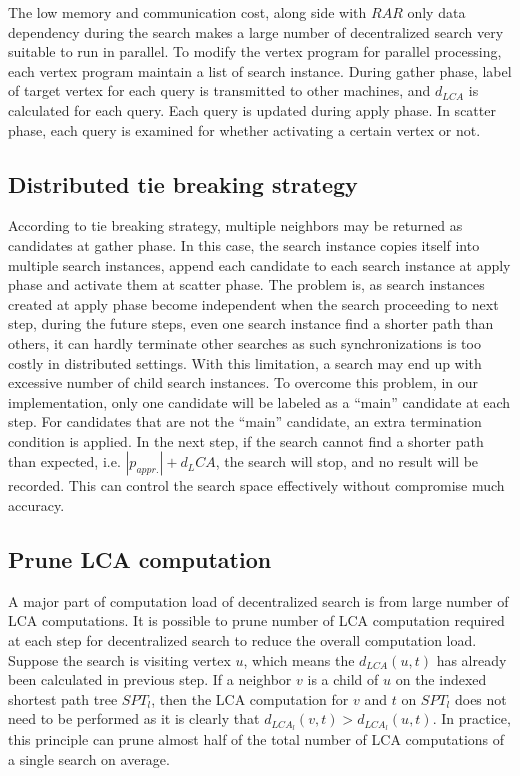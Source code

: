 The low memory and communication cost, along side with $RAR$ only data dependency during the search makes a large number of decentralized search very suitable to run in parallel. To modify the vertex program for parallel processing, each vertex program maintain a list of search instance. During gather phase, label of target vertex for each query is transmitted to other machines, and $d_{LCA}$ is calculated for each query. Each query is updated during apply phase. In scatter phase, each query is examined for whether activating a certain vertex or not.

\subsection{Distributed tie breaking strategy}
According to tie breaking strategy, multiple neighbors may be returned as candidates at gather phase. In this case, the search instance copies itself into multiple search instances, append each candidate to each search instance at apply phase and activate them at scatter phase. The problem is, as search instances created at apply phase become independent when the search proceeding to next step, during the future steps, even one search instance find a shorter path than others, it can hardly terminate other searches as such synchronizations is too costly in distributed settings. With this limitation, a search may end up with excessive number of child search instances. To overcome this problem, in our implementation, only one candidate will be labeled as a "`main"' candidate at each step. For candidates that are not the "`main"' candidate, an extra termination condition is applied. In the next step, if the search cannot find a shorter path than expected, i.e. $|p_{appr.}| + d_LCA$, the search will stop, and no result will be recorded. This can control the search space effectively without compromise much accuracy.

\subsection{Prune LCA computation}
A major part of computation load of decentralized search is from large number of LCA computations. It is possible to prune number of LCA computation required at each step for decentralized search to reduce the overall computation load. Suppose the search is visiting vertex $u$, which means the $d_{LCA}(u, t)$ has already been calculated in previous step. If a neighbor $v$ is a child of $u$ on the indexed shortest path tree $SPT_l$, then the LCA computation for $v$ and $t$ on $SPT_l$ does not need to be performed as it is clearly that $d_{LCA_l}(v, t) > d_{LCA_l}(u, t)$. In practice, this principle can prune almost half of the total number of LCA computations of a single search on average.
